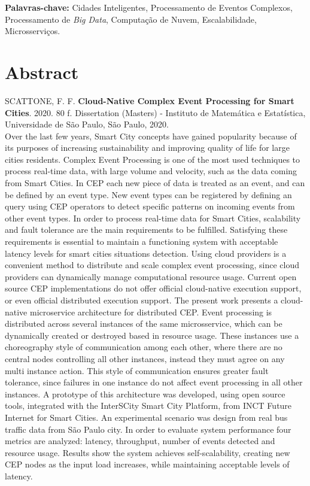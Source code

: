 \documentclass[11pt,twoside,a4paper]{book}
\begin{document}
 
 \noindent \textbf{Palavras-chave:} Cidades Inteligentes, Processamento de Eventos Complexos, Processamento de \emph{Big Data}, Computação de Nuvem, Escalabilidade, Microsserviços.

\chapter*{Abstract}
\noindent SCATTONE, F. F. \textbf{Cloud-Native Complex Event Processing for Smart Cities}. 
2020. 80 f.
Dissertation (Masters) - Instituto de Matemática e Estatística,
Universidade de São Paulo, São Paulo, 2020.
\\

Over the last few years, Smart City concepts have gained popularity because of its purposes of increasing sustainability and improving quality of life for large cities residents. Complex Event Processing is one of the most used techniques to process real-time data, with large volume and velocity, such as the data coming from Smart Cities. In CEP each new piece of data is treated as an event, and can be defined by an event type. New event types can be registered by defining an query using CEP operators to detect specific patterns on incoming events from other event types. In order to process real-time data for Smart Cities, scalability and fault tolerance are the main requirements to be fulfilled. Satisfying these requirements is essential to maintain a functioning system with acceptable latency levels for smart cities situations detection. Using cloud providers is a convenient method  to distribute and scale complex event processing, since cloud providers can dynamically manage computational resource usage. Current open source CEP implementations do not offer official cloud-native execution support, or even official distributed execution support.  The present work presents a cloud-native microservice architecture for distributed CEP. Event processing is distributed across several instances of the same microsservice, which can be dynamically created or destroyed based in resource usage. These instances use a choreography style of communication among each other, where there are no central nodes controlling all other instances, instead they must agree on any multi instance action. This style of communication ensures greater fault tolerance, since failures in one instance do not affect event processing in all other instances. A prototype of this architecture was developed, using open source tools, integrated with the InterSCity Smart City Platform, from INCT Future Internet for Smart Cities. An experimental scenario was design from real bus traffic data from São Paulo city.
In order to evaluate system performance four metrics are analyzed: latency, throughput, number of events detected and resource usage. Results show the system achieves self-scalability, creating new CEP nodes as the input load increases, while maintaining acceptable levels of latency. 
\\
\end{document}

